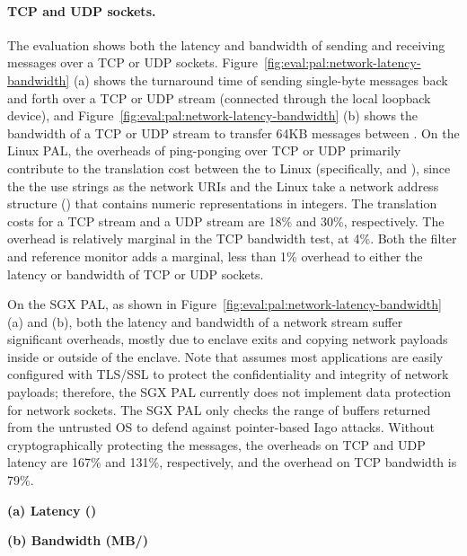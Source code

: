\paragraph{TCP and UDP sockets.}
The evaluation shows both the latency and bandwidth of sending and receiving messages over a TCP or UDP sockets.
Figure~\ref{fig:eval:pal:network-latency-bandwidth} (a) shows the turnaround time of sending single-byte messages back and forth over a TCP or UDP stream (connected through the local loopback device), and
Figure~\ref{fig:eval:pal:network-latency-bandwidth} (b)
shows the bandwidth of a TCP or UDP stream
to transfer
64KB messages between \picoprocs{}.
On the Linux PAL,
the overheads of ping-ponging over TCP or UDP primarily contribute to the translation cost between
the \hostapis{} to Linux \linuxapis{} (specifically,  and ),
since the the \hostapis{} use strings as the network URIs and the Linux \linuxapis{} take a network address structure () that contains numeric representations in integers.
The translation costs for a TCP stream and a UDP stream are \roughly{}18\% and \roughly{}30\%, respectively.
The overhead is relatively marginal in the TCP bandwidth test,
at \roughly{}4\%.
Both the \seccomp{} filter and reference monitor adds
a marginal, less than 1\% overhead
to either the latency or bandwidth of TCP or UDP sockets.


On the SGX PAL, as shown in
Figure~\ref{fig:eval:pal:network-latency-bandwidth} (a) and (b),
both the latency and bandwidth of a network stream suffer significant overheads, mostly due to enclave exits and copying network payloads inside or outside of the enclave. Note that \graphenesgx{} assumes most applications are easily configured with TLS/SSL to protect the confidentiality and integrity of network payloads; therefore, the SGX PAL currently does not implement data protection for network sockets. The SGX PAL only checks the range of buffers
returned from the untrusted OS
to defend against pointer-based Iago attacks.
Without cryptographically protecting the messages, the overheads on TCP and UDP latency are \roughly{}167\% and \roughly{}131\%, respectively, and the overhead on TCP bandwidth is \roughly{}79\%. 

\begin{figure*}[t!]
\centering
\footnotesize
{}
\parbox{0.24\textwidth}{\quad}
\parbox{0.49\textwidth}{\centering\bf (a) Latency ({\usec})}
\parbox{0.24\textwidth}{\centering\bf (b) Bandwidth (MB/\asec{})}
\caption{(a) Latency of sending a short message over TCP and UDP sockets (lower is better), and (b) bandwidth of sending large data over TCP (higher is better).
The comparison is between (1)  and  on Linux; (2)  and  on a Linux PAL, with and without a \seccomp{} filter ({\bf +SC}) and reference monitor ({\bf +RM}); (3) the same \hostapis{} on the SGX PAL, without data protection.}
\label{fig:eval:pal:network-latency-bandwidth}
\end{figure*}




